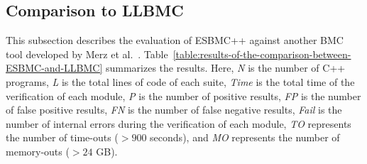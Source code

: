 \documentclass[a4paper]{llncs}
\begin{document}
\subsection{Comparison to LLBMC}
\label{comparison-to-LLBMC}

This subsection describes the evaluation of ESBMC++ against another BMC tool developed by Merz et al.~\cite{Florian12}. Table~\ref{table:results-of-the-comparison-between-ESBMC-and-LLBMC} summarizes the results. Here, \textit{N} is the number of C++ programs, \textit{L} is the total lines of code of each suite, \textit{Time} is the total time of the verification of each module, \textit{P} is the number of positive results, \textit{FP} is the number of false positive results, \textit{FN} is the number of false negative results, \textit{Fail} is the number of internal errors during the verification of each module, \textit{TO} represents the number of time-outs ($>900$ seconds), and \textit{MO} represents the number of memory-outs ($>24$ GB).
\end{document}
